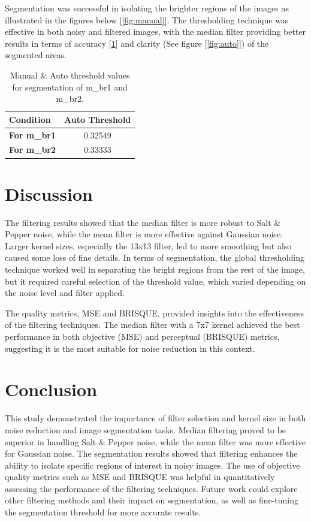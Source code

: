 \documentclass[11pt,letterpaper,twocolumn]{article}
\begin{document}
Segmentation was successful in isolating the brighter regions of the images as illustrated in the figures below [\ref{fig:manual}]. The thresholding technique was effective in both noisy and filtered images, with the median filter providing better results in terms of accuracy [\ref{tab:segmentation_results}] and clarity (See figure [\ref{fig:auto}]) of the segmented areas.\par \vspace{5mm}

\begin{table}[ht]
\centering
\small %
\begin{tabular}{@{} l c @{}} 
\toprule
\textbf{Condition} & \textbf{Auto Threshold} \\ \midrule
\textbf{For m\_br1} & 0.32549 \\
\textbf{For m\_br2} & 0.33333 \\ \bottomrule
\end{tabular}
\caption{Manual \& Auto threshold values for segmentation of m\_br1 and m\_br2.}
\label{tab:segmentation_results}
\end{table}


\section{Discussion}
The filtering results showed that the median filter is more robust to Salt \& Pepper noise, while the mean filter is more effective against Gaussian noise. Larger kernel sizes, especially the 13x13 filter, led to more smoothing but also caused some loss of fine details. In terms of segmentation, the global thresholding technique worked well in separating the bright regions from the rest of the image, but it required careful selection of the threshold value, which varied depending on the noise level and filter applied.

The quality metrics, MSE and BRISQUE, provided insights into the effectiveness of the filtering techniques. The median filter with a 7x7 kernel achieved the best performance in both objective (MSE) and perceptual (BRISQUE) metrics, suggesting it is the most suitable for noise reduction in this context.
\section{Conclusion}
This study demonstrated the importance of filter selection and kernel size in both noise reduction and image segmentation tasks. Median filtering proved to be superior in handling Salt \& Pepper noise, while the mean filter was more effective for Gaussian noise. The segmentation results showed that filtering enhances the ability to isolate specific regions of interest in noisy images. The use of objective quality metrics such as MSE and BRISQUE was helpful in quantitatively assessing the performance of the filtering techniques. Future work could explore other filtering methods and their impact on segmentation, as well as fine-tuning the segmentation threshold for more accurate results.
\end{document}
